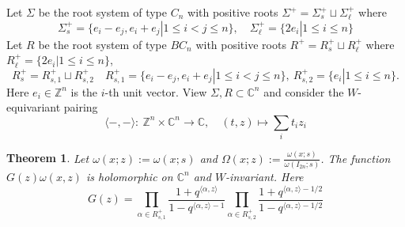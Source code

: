 \documentclass{amsart}
\newtheorem{theorem}{Theorem}[section]
\theoremstyle{definition}
\theoremstyle{remark}
\newcommand{\1}{\mathbf{1}}
\newcommand{\C}{\mathbb{C}}
\theoremstyle{definition}
\newcommand{\BZ}{{\mathbb {Z}}}
\begin{document}
Let $\Sigma$ be the root system of type $C_n$ with positive roots $\Sigma^+=\Sigma_s^+\sqcup \Sigma_\ell^+$ where 
\[ \Sigma_s^+=\{e_i-e_j,e_i+e_j|1\leq i<j\leq n\},\quad \Sigma_\ell^+=\{2e_i|1\leq i\leq n\}\]
Let $R$ be the root system of type $BC_n$ with positive roots  $R^+=R_s^+\sqcup R_\ell^+$ where  $R_\ell^+=\{2e_i|1\leq i\leq n\}$,
\[ R_s^+=R_{s,1}^+\sqcup R_{s,2}^+\quad R_{s,1}^+=\{e_i-e_j,e_i+e_j|1\leq i<j\leq n\},\ R_{s,2}^+=\{e_i|1\leq i\leq n\}. \]
Here $e_i\in\BZ^n$ is the $i$-th unit vector. View $\Sigma, R\subset \C^n$ and consider the $W$-equivariant pairing
\[\langle-,-\rangle:\ \BZ^n\times\C^n\to\C,\quad (t,z)\mapsto\sum_it_iz_i\]
\begin{theorem}\label{FE} Let $\omega(x;z):=\omega(x;s)$ and $\Omega(x;z):=\frac{\omega(x;s)}{\omega(I_{2n};s)}$. The function $G(z)\omega(x,z)$ is holomorphic on $\C^n$ and $W$-invariant.  Here \[G(z)=\prod_{\alpha\in R_{s,1}^+}\frac{1+q^{\langle\alpha,z\rangle}}{1-q^{\langle\alpha,z\rangle-1}}\prod_{\alpha\in R_{s,2}^+}\frac{1+q^{\langle\alpha,z\rangle-1/2}}{1-q^{\langle\alpha,z\rangle-1/2}}\]
\end{theorem}
\end{document}
